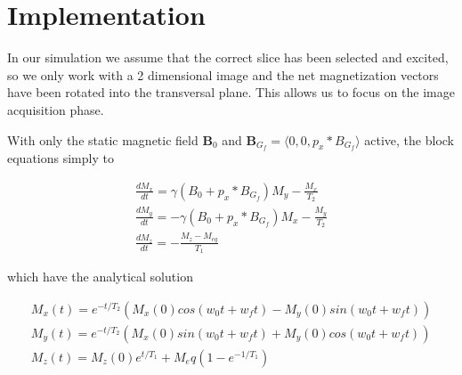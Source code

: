 \section{Implementation}



In our simulation we assume that the correct slice has been selected
and excited, so we only work with a 2 dimensional image and the net
magnetization vectors have been rotated into the transversal
plane. This allows us to focus on the image acquisition phase.


With only the static magnetic field $\mathbf{B}_0$ and
$\mathbf{B}_{G_f} = \langle 0, 0, p_x * B_{G_f} \rangle$ active, the
block equations simply to

\begin{displaymath}
  \begin{array}{l}
    \frac{dM_x}{dt} = \gamma (B_0 + p_x * B_{G_f}) M_y - \frac{M_x}{T_2} \\
    \frac{dM_y}{dt} = - \gamma (B_0 + p_x * B_{G_f}) M_x - \frac{M_y}{T_2} \\
    \frac{dM_z}{dt} = - \frac{M_z - M_{eq}}{T_1}
  \end{array}
\end{displaymath}

which have the analytical solution 

\begin{displaymath}
  \begin{array}{l}
    M_x(t) = e^{-t/T_2}(M_x(0) cos(w_0 t + w_f t) - M_y(0) sin (w_0 t + w_f t)) \\
    M_y(t) = e^{-t/T_2}(M_x(0) sin(w_0 t + w_f t) + M_y(0) cos (w_0 t + w_f t)) \\
    M_z(t) = M_z(0) e^{t/T_1} + M_eq(1 - e^{-1/T_1})
  \end{array}
\end{displaymath}





